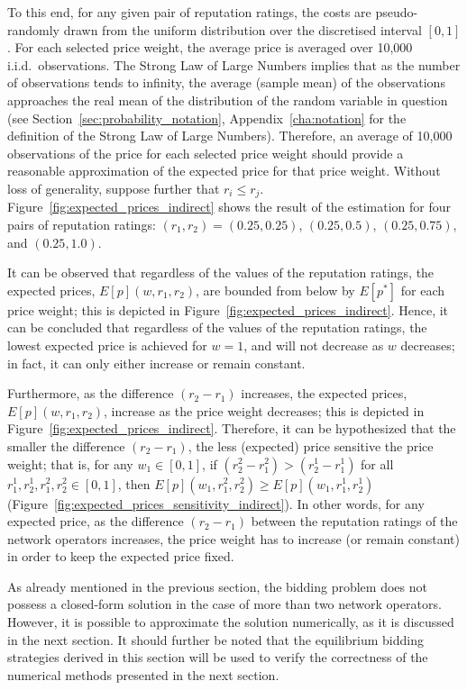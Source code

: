 To this end, for any given pair of reputation ratings, the costs are pseudo-randomly drawn from the uniform distribution over the discretised interval $[0,1]$. For each selected price weight, the average price is averaged over 10,000 i.i.d.~observations. The Strong Law of Large Numbers implies that as the number of observations tends to infinity, the average (sample mean) of the observations approaches the real mean of the distribution of the random variable in question (see Section~\ref{sec:probability_notation}, Appendix~\ref{cha:notation} for the definition of the Strong Law of Large Numbers). Therefore, an average of 10,000 observations of the price for each selected price weight should provide a reasonable approximation of the expected price for that price weight. Without loss of generality, suppose further that $r_i \le r_j$. Figure~\ref{fig:expected_prices_indirect} shows the result of the estimation for four pairs of reputation ratings: $(r_1, r_2) = (0.25, 0.25)$, $(0.25, 0.5)$, $(0.25, 0.75)$, and $(0.25, 1.0)$.

It can be observed that regardless of the values of the reputation ratings, the expected prices, $E[p](w,r_1,r_2)$, are bounded from below by $E[p^*]$ for each price weight; this is depicted in Figure~\ref{fig:expected_prices_indirect}. Hence, it can be concluded that regardless of the values of the reputation ratings, the lowest expected price is achieved for $w=1$, and will not decrease as $w$ decreases; in fact, it can only either increase or remain constant.

Furthermore, as the difference $(r_2-r_1)$ increases, the expected prices, $E[p](w,r_1,r_2)$, increase as the price weight decreases; this is depicted in Figure~\ref{fig:expected_prices_indirect}. Therefore, it can be hypothesized that the smaller the difference $(r_2-r_1)$, the less (expected) price sensitive the price weight; that is, for any $w_1\in[0,1]$, if $(r^2_2-r^2_1) > (r^1_2-r^1_1)$ for all $r^1_1,r^1_2,r^2_1,r^2_2\in [0,1]$, then $E[p](w_1,r^2_1,r^2_2) \ge E[p](w_1,r^1_1,r^1_2)$ (Figure~\ref{fig:expected_prices_sensitivity_indirect}). In other words, for any expected price, as the difference $(r_2-r_1)$ between the reputation ratings of the network operators increases, the price weight has to increase (or remain constant) in order to keep the expected price fixed.

As already mentioned in the previous section, the bidding problem does not possess a closed-form solution in the case of more than two network operators. However, it is possible to approximate the solution numerically, as it is discussed in the next section. It should further be noted that the equilibrium bidding strategies derived in this section will be used to verify the correctness of the numerical methods presented in the next section.

